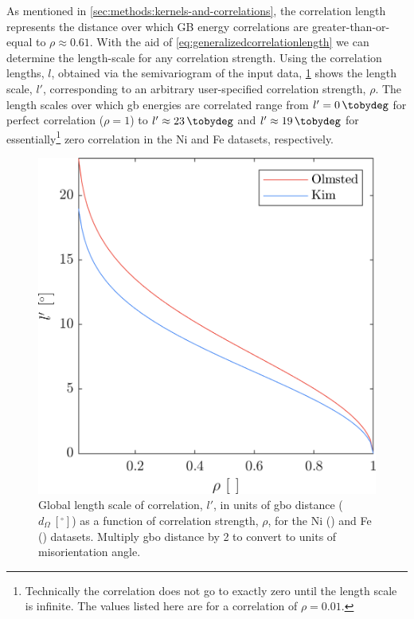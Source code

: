\documentclass[final,twocolumn,12pt]{elsarticle}
\begin{document}
	As mentioned in \cref{sec:methods:kernels-and-correlations}, the correlation length represents the distance over which GB energy correlations are greater-than-or-equal to $\rho \approx 0.61$. With the aid of \cref{eq:generalizedcorrelationlength} we can determine the length-scale for any correlation strength. Using the correlation lengths, $l$, obtained via the semivariogram of the input data, \cref{fig:correlationlengthvsrho} shows the length scale, $l'$, corresponding to an arbitrary user-specified correlation strength, $\rho$. The length scales over which \gls{gb} energies are correlated range from $l' = \SI{0}{\tobydeg}$ for perfect correlation ($\rho = 1$) to $l' \approx \SI{23}{\tobydeg}$ and $l' \approx \SI{19}{\tobydeg}$ for essentially\footnote{Technically the correlation does not go to exactly zero until the length scale is infinite. The values listed here are for a correlation of $\rho = 0.01$.} zero correlation in the Ni and Fe datasets, respectively.
	\begin{figure}
	    \centering
	    \includegraphics[scale=1]{figures/CorrelationLengthVsRho.png}
	    \caption{Global length scale of correlation, $l'$, in units of \gls{gbo} distance ($d_\Omega\ [{}^{\circ}]$) as a function of correlation strength, $\rho$, for the Ni (\citet{olmstedSurveyComputedGrain2009a}) and Fe (\citet{kimPhasefieldModeling3D2014}) datasets. Multiply \gls{gbo} distance by 2 to convert to units of misorientation angle.}
	    \label{fig:correlationlengthvsrho}
	\end{figure}
	
\end{document}
